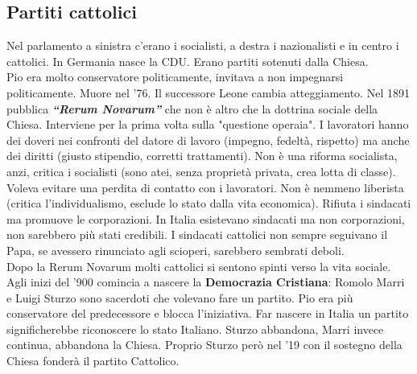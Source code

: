 \subsection{Partiti cattolici}
Nel parlamento a sinistra c'erano i socialisti, a destra i nazionalisti e in centro i cattolici.
In Germania nasce la CDU. Erano partiti sotenuti dalla Chiesa.\\
Pio  era molto conservatore politicamente, invitava a non impegnarsi politicamente. Muore 
nel '76. Il successore Leone  cambia atteggiamento. Nel 1891 pubblica 
\textbf{\emph{``Rerum Novarum''}} che non è altro che la dottrina sociale della Chiesa. Interviene
per la prima volta sulla "questione operaia". I lavoratori hanno dei doveri nei confronti del 
datore di lavoro (impegno, fedeltà, rispetto) ma anche dei diritti (giusto stipendio, corretti
trattamenti). Non è una riforma socialista, anzi, critica i socialisti (sono atei, senza proprietà
privata, crea lotta di classe). Voleva evitare una perdita di contatto con i lavoratori. Non è
nemmeno liberista (critica l'individualismo, esclude lo stato dalla vita economica). Rifiuta i
sindacati ma promuove le corporazioni. In Italia esistevano sindacati ma non corporazioni, non
sarebbero più stati credibili. I sindacati cattolici non sempre seguivano il Papa, se avessero 
rinunciato agli scioperi, sarebbero sembrati deboli.\\
Dopo la Rerum Novarum molti cattolici si sentono spinti verso la vita sociale. Agli inizi del '900
comincia a nascere la \textbf{Democrazia Cristiana}: Romolo Marri e Luigi Sturzo sono sacerdoti che
volevano fare un partito. Pio  era più conservatore del predecessore e blocca l'iniziativa.
Far nascere in Italia un partito significherebbe riconoscere lo stato Italiano. Sturzo abbandona,
Marri invece continua, abbandona la Chiesa. Proprio Sturzo però nel '19 con il sostegno della 
Chiesa fonderà il partito Cattolico.
